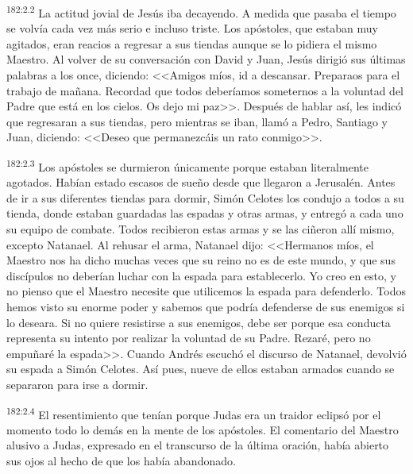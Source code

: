 \par 
\textsuperscript{182:2.2} La actitud jovial de Jesús iba decayendo. A medida que pasaba el tiempo se volvía cada vez más serio e incluso triste. Los apóstoles, que estaban muy agitados, eran reacios a regresar a sus tiendas aunque se lo pidiera el mismo Maestro. Al volver de su conversación con David y Juan, Jesús dirigió sus últimas palabras a los once, diciendo: <<Amigos míos, id a descansar. Preparaos para el trabajo de mañana. Recordad que todos deberíamos someternos a la voluntad del Padre que está en los cielos. Os dejo mi paz>>. Después de hablar así, les indicó que regresaran a sus tiendas, pero mientras se iban, llamó a Pedro, Santiago y Juan, diciendo: <<Deseo que permanezcáis un rato conmigo>>.

\par 
\textsuperscript{182:2.3} Los apóstoles se durmieron únicamente porque estaban literalmente agotados. Habían estado escasos de sueño desde que llegaron a Jerusalén. Antes de ir a sus diferentes tiendas para dormir, Simón Celotes los condujo a todos a su tienda, donde estaban guardadas las espadas y otras armas, y entregó a cada uno su equipo de combate. Todos recibieron estas armas y se las ciñeron allí mismo, excepto Natanael. Al rehusar el arma, Natanael dijo: <<Hermanos míos, el Maestro nos ha dicho muchas veces que su reino no es de este mundo, y que sus discípulos no deberían luchar con la espada para establecerlo. Yo creo en esto, y no pienso que el Maestro necesite que utilicemos la espada para defenderlo. Todos hemos visto su enorme poder y sabemos que podría defenderse de sus enemigos si lo deseara. Si no quiere resistirse a sus enemigos, debe ser porque esa conducta representa su intento por realizar la voluntad de su Padre. Rezaré, pero no empuñaré la espada>>. Cuando Andrés escuchó el discurso de Natanael, devolvió su espada a Simón Celotes. Así pues, nueve de ellos estaban armados cuando se separaron para irse a dormir.

\par 
\textsuperscript{182:2.4} El resentimiento que tenían porque Judas era un traidor eclipsó por el momento todo lo demás en la mente de los apóstoles. El comentario del Maestro alusivo a Judas, expresado en el transcurso de la última oración, había abierto sus ojos al hecho de que los había abandonado.

